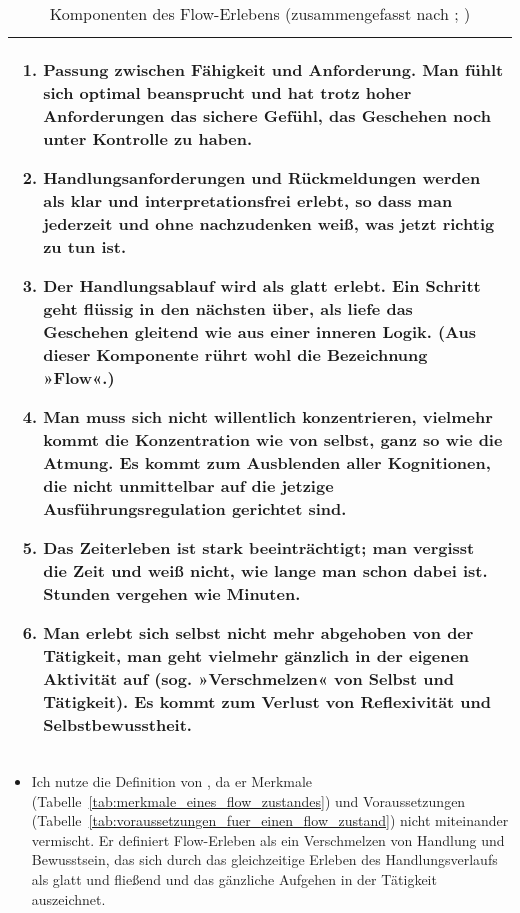 \begin{table}
	[!htb] \caption[Komponenten des Flow-Erlebens]{Komponenten des Flow-Erlebens (zusammengefasst nach \citet{Csikszentmihalyi2010}; \citep[S.~153ff]{Rheinberg2008})} \label{tab:komponenten_des_flow_erlebens} 
	\begin{tabularx}
		{ 
		\textwidth}{X} \midrule \begin{enumerate}

	\item Passung zwischen Fähigkeit und Anforderung. Man fühlt sich optimal beansprucht und hat trotz hoher Anforderungen das sichere Gefühl, das Geschehen noch unter Kontrolle zu haben. 

			\item Handlungsanforderungen und Rückmeldungen werden als klar und interpretationsfrei erlebt, so dass man jederzeit und ohne nachzudenken weiß, was jetzt richtig zu tun ist. 

			\item Der Handlungsablauf wird als glatt erlebt. Ein Schritt geht flüssig in den nächsten über, als liefe das Geschehen gleitend wie aus einer inneren Logik. (Aus dieser Komponente rührt wohl die Bezeichnung »Flow«.) 

			\item Man muss sich nicht willentlich konzentrieren, vielmehr kommt die Konzentration wie von selbst, ganz so wie die Atmung. Es kommt zum Ausblenden aller Kognitionen, die nicht unmittelbar auf die jetzige Ausführungsregulation gerichtet sind. 

			\item Das Zeiterleben ist stark beeinträchtigt; man vergisst die Zeit und weiß nicht, wie lange man schon dabei ist. Stunden vergehen wie Minuten. 

			\item Man erlebt sich selbst nicht mehr abgehoben von der Tätigkeit, man geht vielmehr gänzlich in der eigenen Aktivität auf (sog. »Verschmelzen« von Selbst und Tätigkeit). Es kommt zum Verlust von Reflexivität und Selbstbewusstheit. 

\end{enumerate} \\

		\bottomrule 
	\end{tabularx}
\end{table}
\begin{itemize}
	
	\item Ich nutze die Definition von \citet{Henk2014}, da er Merkmale (Tabelle~\ref{tab:merkmale_eines_flow_zustandes}) und Voraussetzungen (Tabelle~\ref{tab:voraussetzungen_fuer_einen_flow_zustand}) nicht miteinander vermischt. Er definiert Flow-Erleben als ein Verschmelzen von Handlung und Bewusstsein, das sich durch das gleichzeitige Erleben des Handlungsverlaufs als glatt und fließend und das gänzliche Aufgehen in der Tätigkeit auszeichnet. 
\end{itemize}

